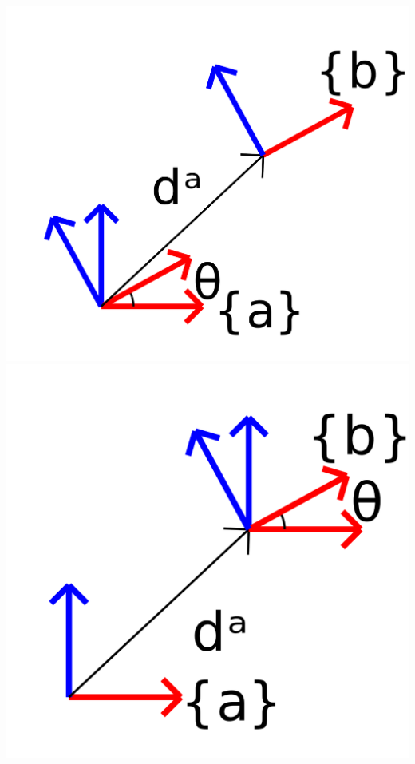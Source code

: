\documentclass{16384_doc}
\begin{document}
\begin{center}
\includegraphics[scale=0.1]{generated_figures/bg_homo_r_then_t.png}
\includegraphics[scale=0.1]{generated_figures/bg_homo_t_then_r.png}
\end{center}
\end{document}
